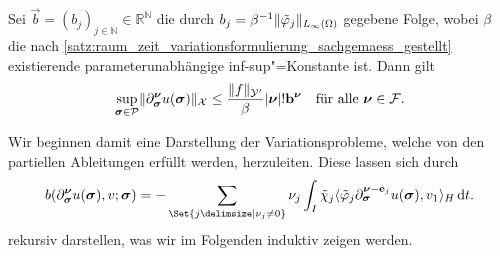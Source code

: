 \documentclass[../main.tex]{subfiles}
\begin{document}
\begin{Satz}
\label{satz:abschaetzung_norm_partieller_ableitungen}
    Sei $\vec b = (b_j)_{j \in \mathbb{N}} \in \mathbb{R}^{\mathbb{N}}$ die durch $b_{j} = \beta^{-1} \lVert\tilde{\varphi}_{j}\rVert_{L_{\infty}(\Omega)}$ gegebene Folge, wobei $\beta$ die nach \cref{satz:raum_zeit_variationsformulierung_sachgemaess_gestellt} existierende parameterunabhängige inf-sup"=Konstante ist.
    Dann gilt
    \begin{equation}
        \label{eq:abschaetzung_norm_partieller_ableitungen}
        \sup_{\bm\sigma \in \mathcal P} \norm{\partial^{\bm\nu}_{\bm\sigma} u(\bm\sigma)}_{\mathcal X} \leq \frac{\norm{f}_{\mathcal Y'}}{\beta} \abs{\bm\nu}! \vec b^{\bm\nu} \quad \fa \bm \nu \in \mathcal F.
    \end{equation}

    \begin{Beweis}
        Wir beginnen damit eine Darstellung der Variationsprobleme, welche von den partiellen Ableitungen erfüllt werden, herzuleiten.
        Diese lassen sich durch
        \begin{equation}
        \label{eq:abschaetzung_norm_partieller_ableitungen:rekursiv}
            b(\partial^{\bm\nu}_{\bm\sigma} u(\bm\sigma), v; \bm\sigma)
            = - \sum_{\Set{j \given \nu_{j} \neq 0}} \nu_{j} \int_{I} \tilde{\chi}_{j} \skp{\tilde{\varphi}_{j} \partial^{\bm\nu - \vec e_{j}}_{\bm\sigma} u(\bm\sigma)}{v_{1}}{H} \diff t.
        \end{equation}
        rekursiv darstellen, was wir im Folgenden induktiv zeigen werden.


\end{Beweis}
\end{Satz}
\end{document}
